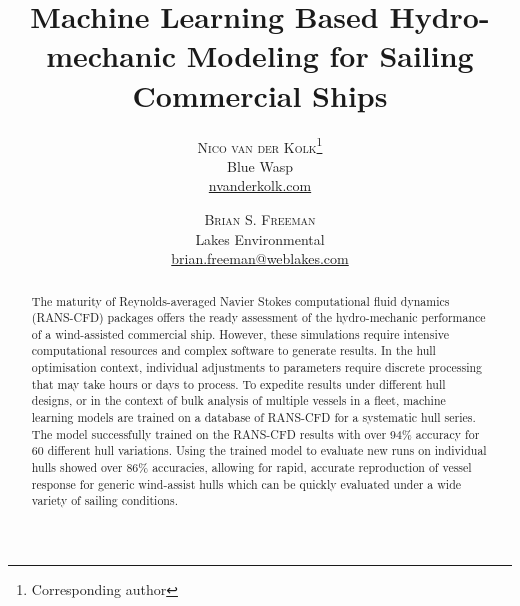 \documentclass[twoside,twocolumn]{article}
\begin{document}

\setlength{\droptitle}{-4\baselineskip} %

\title{Machine Learning Based Hydro-mechanic Modeling for Sailing Commercial Ships} %
\author{%
\textsc{Nico van der Kolk}\thanks{Corresponding author} \\[1ex] %
\normalsize Blue Wasp \\ %
\normalsize \href{mailto:nvanderkolk@bluewaspmarine.com}{nvanderkolk\@bluewaspmarine.com} %
\and %
\textsc{Brian S. Freeman} \\[1ex] %
\normalsize Lakes Environmental \\ %
\normalsize \href{brian.freeman@weblakes.com}{brian.freeman@weblakes.com } %
}
\date{} %
\begin{abstract}
\noindent 
The maturity of Reynolds-averaged Navier Stokes computational fluid dynamics (RANS-CFD) packages offers the ready assessment of the hydro-mechanic performance of a wind-assisted commercial ship. However, these simulations require intensive computational resources and complex software to generate results. In the hull optimisation context, individual adjustments to parameters require discrete processing that may take hours or days to process. To expedite results under different hull designs, or in the context of bulk analysis of multiple vessels in a fleet,  machine learning models are trained on a database of RANS-CFD for a systematic hull series. The model successfully trained on the RANS-CFD results with over 94\% accuracy for 60 different hull variations. Using the trained model to evaluate new runs on individual hulls showed over 86\% accuracies, allowing for rapid, accurate reproduction of vessel response for generic wind-assist hulls which can be quickly evaluated under a wide variety of sailing conditions. 
\end{abstract}
\end{document}
